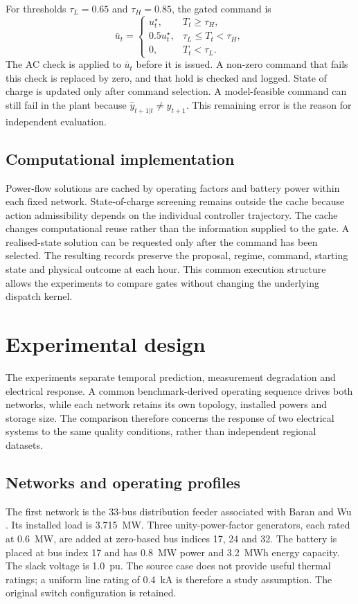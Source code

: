 \documentclass[11pt,a4paper]{article}
\begin{document}
For thresholds $\tau_L=0.65$ and $\tau_H=0.85$, the gated command is
\begin{equation}
\bar u_t=\begin{cases}
u_t^\star,&T_t\geq\tau_H,\\
0.5u_t^\star,&\tau_L\leq T_t<\tau_H,\\
0,&T_t<\tau_L.
\end{cases}\label{eq:regimes}
\end{equation}
The AC check is applied to $\bar u_t$ before it is issued. A non-zero command that fails this check is replaced by zero, and that hold is checked and logged. State of charge is updated only after command selection. A model-feasible command can still fail in the plant because $\widehat y_{t+1|t}\ne y_{t+1}$. This remaining error is the reason for independent evaluation.

\subsection{Computational implementation}
Power-flow solutions are cached by operating factors and battery power within each fixed network. State-of-charge screening remains outside the cache because action admissibility depends on the individual controller trajectory. The cache changes computational reuse rather than the information supplied to the gate. A realised-state solution can be requested only after the command has been selected. The resulting records preserve the proposal, regime, command, starting state and physical outcome at each hour. This common execution structure allows the experiments to compare gates without changing the underlying dispatch kernel.

\section{Experimental design}\label{sec:experiments}
The experiments separate temporal prediction, measurement degradation and electrical response. A common benchmark-derived operating sequence drives both networks, while each network retains its own topology, installed powers and storage size. The comparison therefore concerns the response of two electrical systems to the same quality conditions, rather than independent regional datasets.

\subsection{Networks and operating profiles}
The first network is the 33-bus distribution feeder associated with Baran and Wu \cite{baran}. Its installed load is 3.715~MW. Three unity-power-factor generators, each rated at 0.6~MW, are added at zero-based bus indices 17, 24 and 32. The battery is placed at bus index 17 and has 0.8~MW power and 3.2~MWh energy capacity. The slack voltage is 1.0~pu. The source case does not provide useful thermal ratings; a uniform line rating of 0.4~kA is therefore a study assumption. The original switch configuration is retained.
\end{document}
